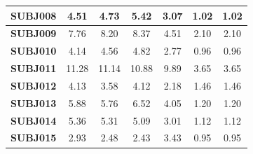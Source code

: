 \documentclass[idxtotoc,hyperref,openany]{labbook} %
\begin{document}
\begin{table}[]
\begin{tabular}{ccccccc}
		\multicolumn{1}{|c|}{\textbf{SUBJ008}}  & \multicolumn{1}{c|}{4.51}              & \multicolumn{1}{c|}{4.73}              & \multicolumn{1}{c|}{5.42}              & \multicolumn{1}{c|}{3.07}         & \multicolumn{1}{c|}{1.02}               & \multicolumn{1}{c|}{1.02}               \\ \hline
		\multicolumn{1}{|c|}{\textbf{SUBJ009}}  & \multicolumn{1}{c|}{7.76}              & \multicolumn{1}{c|}{8.20}              & \multicolumn{1}{c|}{8.37}              & \multicolumn{1}{c|}{4.51}         & \multicolumn{1}{c|}{2.10}               & \multicolumn{1}{c|}{2.10}               \\ \hline
		\multicolumn{1}{|c|}{\textbf{SUBJ010}}  & \multicolumn{1}{c|}{4.14}              & \multicolumn{1}{c|}{4.56}              & \multicolumn{1}{c|}{4.82}              & \multicolumn{1}{c|}{2.77}         & \multicolumn{1}{c|}{0.96}               & \multicolumn{1}{c|}{0.96}               \\ \hline
		\multicolumn{1}{|c|}{\textbf{SUBJ011}}  & \multicolumn{1}{c|}{11.28}             & \multicolumn{1}{c|}{11.14}             & \multicolumn{1}{c|}{10.88}             & \multicolumn{1}{c|}{9.89}         & \multicolumn{1}{c|}{3.65}               & \multicolumn{1}{c|}{3.65}               \\ \hline
		\multicolumn{1}{|c|}{\textbf{SUBJ012}}  & \multicolumn{1}{c|}{4.13}              & \multicolumn{1}{c|}{3.58}              & \multicolumn{1}{c|}{4.12}              & \multicolumn{1}{c|}{2.18}         & \multicolumn{1}{c|}{1.46}               & \multicolumn{1}{c|}{1.46}               \\ \hline
		\multicolumn{1}{|c|}{\textbf{SUBJ013}}  & \multicolumn{1}{c|}{5.88}              & \multicolumn{1}{c|}{5.76}              & \multicolumn{1}{c|}{6.52}              & \multicolumn{1}{c|}{4.05}         & \multicolumn{1}{c|}{1.20}               & \multicolumn{1}{c|}{1.20}               \\ \hline
		\multicolumn{1}{|c|}{\textbf{SUBJ014}}  & \multicolumn{1}{c|}{5.36}              & \multicolumn{1}{c|}{5.31}              & \multicolumn{1}{c|}{5.09}              & \multicolumn{1}{c|}{3.01}         & \multicolumn{1}{c|}{1.12}               & \multicolumn{1}{c|}{1.12}               \\ \hline
		\multicolumn{1}{|c|}{\textbf{SUBJ015}}  & \multicolumn{1}{c|}{2.93}              & \multicolumn{1}{c|}{2.48}              & \multicolumn{1}{c|}{2.43}              & \multicolumn{1}{c|}{3.43}         & \multicolumn{1}{c|}{0.95}               & \multicolumn{1}{c|}{0.95}               \\ \hline

\end{tabular}
\end{table}
\end{document}
